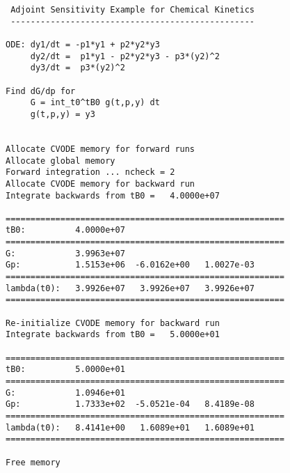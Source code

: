 \begin{verbatim}
 Adjoint Sensitivity Example for Chemical Kinetics
 -------------------------------------------------

ODE: dy1/dt = -p1*y1 + p2*y2*y3
     dy2/dt =  p1*y1 - p2*y2*y3 - p3*(y2)^2
     dy3/dt =  p3*(y2)^2

Find dG/dp for
     G = int_t0^tB0 g(t,p,y) dt
     g(t,p,y) = y3


Allocate CVODE memory for forward runs
Allocate global memory
Forward integration ... ncheck = 2
Allocate CVODE memory for backward run
Integrate backwards from tB0 =   4.0000e+07

========================================================
tB0:          4.0000e+07 
========================================================
G:            3.9963e+07 
Gp:           1.5153e+06  -6.0162e+00   1.0027e-03
========================================================
lambda(t0):   3.9926e+07   3.9926e+07   3.9926e+07
========================================================

Re-initialize CVODE memory for backward run
Integrate backwards from tB0 =   5.0000e+01

========================================================
tB0:          5.0000e+01 
========================================================
G:            1.0946e+01 
Gp:           1.7333e+02  -5.0521e-04   8.4189e-08
========================================================
lambda(t0):   8.4141e+00   1.6089e+01   1.6089e+01
========================================================

Free memory
\end{verbatim}